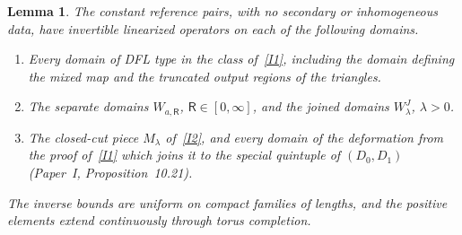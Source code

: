 \documentclass[11pt]{amsart}
\newtheorem{lemma}[theorem]{Lemma}
\theoremstyle{definition}
\theoremstyle{remark}
\theoremstyle{plain}
\numberwithin{equation}{section}
\begin{document}
\begin{lemma}\label{lem:constant-pairs}
The constant reference pairs, with no secondary or inhomogeneous data,
have invertible linearized operators on each of the following domains.
\begin{enumerate}[label=(\alph*)]
\item Every domain of DFL type in the class of~\ref{I1}, including the
domain defining the mixed map and the truncated output regions of the triangles.
\item The separate domains $W_{a,\mathsf R}$, $\mathsf R\in[0,\infty]$, and
the joined domains $W^J_\lambda$, $\lambda>0$.
\item The closed-cut piece $M_\lambda$ of~\ref{I2}, and every domain of the
deformation from the proof of~\ref{I1} which joins it to the special
quintuple of $(D_0,D_1)$ (Paper~I, Proposition~10.21).
\end{enumerate}
The inverse bounds are uniform on compact
families of lengths, and the positive elements extend continuously
through torus completion.
\end{lemma}
\end{document}
